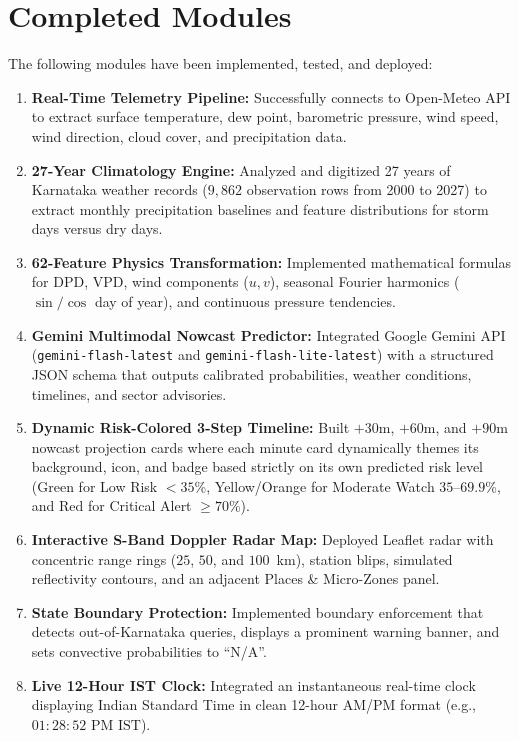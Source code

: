 \documentclass[12pt,a4paper]{report}
\begin{document}
\section{Completed Modules}
The following modules have been implemented, tested, and deployed:
\begin{enumerate}[leftmargin=*]
    \item \textbf{Real-Time Telemetry Pipeline:} Successfully connects to Open-Meteo API to extract surface temperature, dew point, barometric pressure, wind speed, wind direction, cloud cover, and precipitation data.
    \item \textbf{27-Year Climatology Engine:} Analyzed and digitized 27 years of Karnataka weather records ($9,862$ observation rows from 2000 to 2027) to extract monthly precipitation baselines and feature distributions for storm days versus dry days.
    \item \textbf{62-Feature Physics Transformation:} Implemented mathematical formulas for DPD, VPD, wind components ($u, v$), seasonal Fourier harmonics ($\sin/\cos$ day of year), and continuous pressure tendencies.
    \item \textbf{Gemini Multimodal Nowcast Predictor:} Integrated Google Gemini API (\texttt{gemini-flash-latest} and \texttt{gemini-flash-lite-latest}) with a structured JSON schema that outputs calibrated probabilities, weather conditions, timelines, and sector advisories.
    \item \textbf{Dynamic Risk-Colored 3-Step Timeline:} Built $+30$m, $+60$m, and $+90$m nowcast projection cards where each minute card dynamically themes its background, icon, and badge based strictly on its own predicted risk level (Green for Low Risk $<35$\%, Yellow/Orange for Moderate Watch $35$--$69.9$\%, and Red for Critical Alert $\ge 70$\%).
    \item \textbf{Interactive S-Band Doppler Radar Map:} Deployed Leaflet radar with concentric range rings ($25$, $50$, and $100$~km), station blips, simulated reflectivity contours, and an adjacent Places \& Micro-Zones panel.
    \item \textbf{State Boundary Protection:} Implemented boundary enforcement that detects out-of-Karnataka queries, displays a prominent warning banner, and sets convective probabilities to ``N/A''.
    \item \textbf{Live 12-Hour IST Clock:} Integrated an instantaneous real-time clock displaying Indian Standard Time in clean 12-hour AM/PM format (e.g., $01:28:52\text{ PM IST}$).
\end{enumerate}
\end{document}
